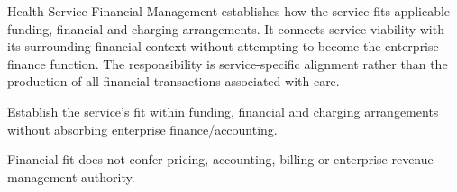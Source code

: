 Health Service Financial Management establishes how the service fits applicable funding, financial and charging arrangements. It connects service viability with its surrounding financial context without attempting to become the enterprise finance function. The responsibility is service-specific alignment rather than the production of all financial transactions associated with care.



Establish the service’s fit within funding, financial and charging arrangements without absorbing enterprise finance/\allowbreak{}accounting.



Financial fit does not confer pricing, accounting, billing or enterprise revenue-management authority.



